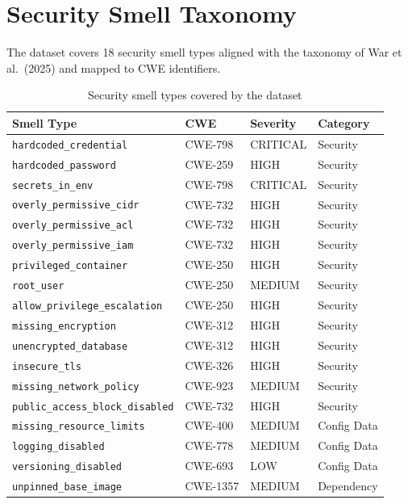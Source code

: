 \documentclass[11pt,a4paper]{article}
\begin{document}
\section{Security Smell Taxonomy}

The dataset covers 18 security smell types aligned with the taxonomy of War et al.\ (2025) and mapped to CWE identifiers.

\begin{table}[h]
\centering
\caption{Security smell types covered by the dataset}
\begin{tabular}{@{}llll@{}}
\toprule
\textbf{Smell Type} & \textbf{CWE} & \textbf{Severity} & \textbf{Category} \\
\midrule
\texttt{hardcoded\_credential}          & CWE-798  & CRITICAL & Security \\
\texttt{hardcoded\_password}            & CWE-259  & HIGH     & Security \\
\texttt{secrets\_in\_env}               & CWE-798  & CRITICAL & Security \\
\texttt{overly\_permissive\_cidr}       & CWE-732  & HIGH     & Security \\
\texttt{overly\_permissive\_acl}        & CWE-732  & HIGH     & Security \\
\texttt{overly\_permissive\_iam}        & CWE-732  & HIGH     & Security \\
\texttt{privileged\_container}          & CWE-250  & HIGH     & Security \\
\texttt{root\_user}                     & CWE-250  & MEDIUM   & Security \\
\texttt{allow\_privilege\_escalation}   & CWE-250  & HIGH     & Security \\
\texttt{missing\_encryption}            & CWE-312  & HIGH     & Security \\
\texttt{unencrypted\_database}          & CWE-312  & HIGH     & Security \\
\texttt{insecure\_tls}                  & CWE-326  & HIGH     & Security \\
\texttt{missing\_network\_policy}       & CWE-923  & MEDIUM   & Security \\
\texttt{public\_access\_block\_disabled}& CWE-732  & HIGH     & Security \\
\texttt{missing\_resource\_limits}      & CWE-400  & MEDIUM   & Config Data \\
\texttt{logging\_disabled}              & CWE-778  & MEDIUM   & Config Data \\
\texttt{versioning\_disabled}           & CWE-693  & LOW      & Config Data \\
\texttt{unpinned\_base\_image}          & CWE-1357 & MEDIUM   & Dependency \\
\bottomrule
\end{tabular}
\end{table}
\end{document}
